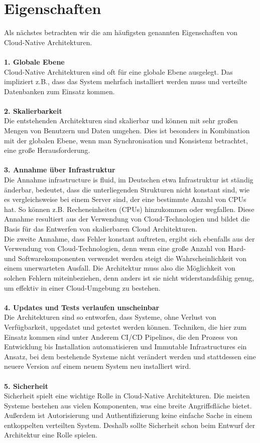 \section{Eigenschaften}
Als nächstes betrachten wir die am häufigsten genannten Eigenschaften von Cloud-Native Architekturen.\\
\\
\textbf{1. Globale Ebene}\\
Cloud-Native Architekturen sind oft für eine globale Ebene ausgelegt. Das impliziert z.B., dass das System mehrfach installiert werden muss und verteilte Datenbanken zum Einsatz kommen.\\
\\
\textbf{2. Skalierbarkeit}\\
Die entstehenden Architekturen sind skalierbar und können mit sehr großen Mengen von Benutzern und Daten umgehen. Dies ist besonders in Kombination mit der globalen Ebene, wenn man Synchronisation und Konsistenz betrachtet, eine große Herausforderung.\\
\\
\textbf{3. Annahme über Infrastruktur}\\
Die Annahme \glqq infrastructure is fluid\grqq{}, im Deutschen etwa Infrastruktur ist ständig änderbar, bedeutet, dass die unterliegenden Strukturen nicht konstant sind, wie es vergleichsweise bei einem Server sind, der eine bestimmte Anzahl von CPUs hat. So können z.B. Recheneinheiten (CPUs) hinzukommen oder wegfallen. Diese Annahme resultiert aus der Verwendung von Cloud-Technologien und bildet die Basis für das Entwerfen von skalierbaren Cloud Architekturen.\\
Die zweite Annahme, dass Fehler konstant auftreten, ergibt sich ebenfalls aus der Verwendung von Cloud-Technologien, denn wenn eine große Anzahl von Hard- und Softwarekomponenten verwendet werden steigt die Wahrscheinlichkeit von einem unerwarteten Ausfall. Die Architektur muss also die Möglichkeit von solchen Fehlern miteinbeziehen, denn anders ist sie nicht widerstandsfähig genug, um effektiv in einer Cloud-Umgebung zu bestehen.\\
\\
\textbf{4. Updates und Tests verlaufen unscheinbar}\\
Die Architekturen sind so entworfen, dass Systeme, ohne Verlust von Verfügbarkeit, upgedatet und getestet werden können. Techniken, die hier zum Einsatz kommen sind unter Anderem CI/CD Pipelines, die den Prozess von Entwicklung bis Installation automatisieren und Immutable Infrastructures ein Ansatz, bei dem bestehende Systeme nicht verändert werden und stattdessen eine neuere Version auf einem neuem System neu installiert wird.\\
\\
\textbf{5. Sicherheit}\\
Sicherheit spielt eine wichtige Rolle in Cloud-Native Architekturen. Die meisten Systeme bestehen aus vielen Komponenten, was eine breite Angriffsfläche bietet. Außerdem ist Autorisierung und Authentifizierung keine einfache Sache in einem entkoppelten verteilten System. Deshalb sollte Sicherheit schon beim Entwurf der Architektur eine Rolle spielen.\cite{cloud-NativeApplications}

